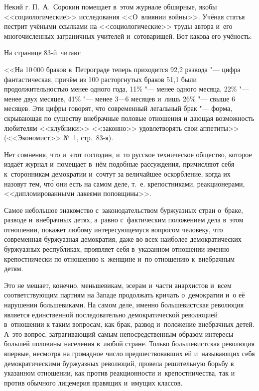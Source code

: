 Некий г. П.~А.~Сорокин помещает в~этом журнале обширные, якобы
<<социологические>> исследования <<О~влиянии войны>>. Учёная статья
пестрит учёными ссылками на <<социологические>> труды автора и~его
многочисленных заграничных учителей и~сотоварищей. Вот какова его учёность:

На странице 83-й~читаю:

\medskip
{\small
<<На 10\,000 браков в~Петрограде теперь приходится 92,2 развода "--- цифра
фантастическая, причём из 100 расторгнутых браков 51,1 были
продолжительностью менее одного года, 11\% "--- менее одного месяца,
22\% "--- менее двух месяцев, 41\% "--- менее 3---6 месяцев и~лишь
26\% "--- свыше 6 месяцев. Эти цифры говорят, что современный легальный
брак "--- форма, скрывающая по существу внебрачные половые отношения и
дающая возможность любителям <<клубники>> <<законно>> удовлетворять свои
аппетиты>> (<<Экономист>> №~1, стр.~83-я).}
\medskip

Нет сомнения, что и~этот господин, и~то русское техническое общество,
которое издаёт журнал и~помещает в~нём подобные рассуждения, причисляют
себя к~сторонникам демократии и~сочтут за величайшее оскорбление, когда их
назовут тем, чт\'{о} они есть на самом деле, т.~е. крепостниками,
реакционерами, <<дипломированными лакеями поповщины>>.

Самое небольшое знакомство с~законодательством буржуазных стран о~браке,
разводе и~внебрачных детях, а~равно с~фактическим положением дела в~этом
отношении, покажет любому интересующемуся вопросом человеку, что
современная буржуазная демократия, даже во всех наиболее демократических
буржуазных республиках, проявляет себя в~указанном отношении именно
крепостнически по отношению к~женщине и~по отношению к~внебрачным детям.

Это не мешает, конечно, меньшевикам, эсерам и~части анархистов и~всем
соответствующим партиям на Западе продолжать кричать о~демократии и~о её
нарушении большевиками. На самом деле, именно большевистская революция
является единственной последовательно демократической революцией в~отношении
к таким вопросам, как брак, развод и~положение внебрачных детей. А~это
вопрос, затрагивающий самым непосредственным образом интересы большей
половины населения в~любой стране. Только большевистская революция впервые,
несмотря на громадное число предшествовавших ей и~называющих себя
демократическими буржуазных революций, провела решительную борьбу в
указанном отношении, как против реакционности и~крепостничества, так и
против обычного лицемерия правящих и~имущих классов.

